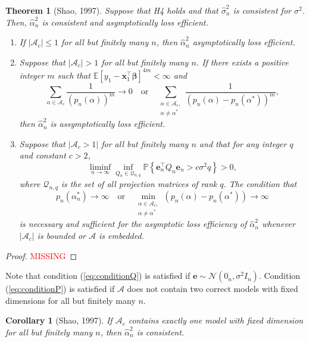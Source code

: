 \documentclass[12pt, letter paper]{article}
\newcommand{\1}{\mathmybb{1}}
\newtheorem{theorem}[proposition]{Theorem}
\newtheorem{corollary}[proposition]{Corollary}
\newcommand{\0}{\emptyset}
\newcommand{\prob}{\mathbb{P}}
\newcommand{\Ep}[1]{\mathbb{E}\left[ #1 \right]}
\newcommand{\paren}[1]{\left(#1 \right)}
\newcommand{\set}[1]{\left\{ #1 \right\}}
\newcommand{\Acal}{\mathcal{A}}
\newcommand{\Ncal}{\mathcal{N}}
\newcommand{\x}{\boldsymbol{x}}
\newcommand{\e}{\boldsymbol{e}}
\newcommand{\bbeta}{\boldsymbol{\beta}}
\newcommand{\alphahat}[1]{\hat{\alpha}^{#1}}
\newcommand{\sigmahat}{\hat{\sigma}^{2}_{n}}
\begin{document}
\begin{theorem}[Shao, 1997]\label{prop:97thm1}
    Suppose that H4 holds and that \(\sigmahat\) is consistent for \(\sigma^{2}\). Then, \(\alphahat{2}_{n}\) is consistent and asymptotically loss efficient.
    \begin{enumerate}
        \item If \(|\Acal_{c}|\leq1\) for all but finitely many \(n\), then \(\alphahat{2}_{n}\) asymptotically loss efficient.
        \item Suppose that \(|\Acal_{c}|> 1\) for all but finitely many \(n\). If there exists a positive integer \(m\) such that \(\Ep{y_{1} - \x_{1}^{\top}\bbeta}^{4m}<\infty\) and 
        \begin{equation}
            \sum_{\alpha\in\Acal_{c}}\frac{1}{\paren{p_{n}(\alpha)}^{m}}\to 0 \quad\text{or}\quad \sum_{\substack{\alpha\in\Acal_{c},\\ \alpha\neq\alpha^{*}}}\frac{1}{\paren{p_{n}(\alpha) - p_{n}(\alpha^{*})}^{m}},
        \end{equation}
        then \(\alphahat{2}_{n}\) is assymptotically loss efficient.
        \item Suppose that \(|\Acal_{c}>1|\) for all but finitely many \(n\) and that for any integer \(q\) and constant \(c>2\), 
        \begin{equation}
            \label{eq:conditionQ}
            \liminf_{n\to\infty}\inf_{Q_{n}\in\mathcal{Q}_{n,q}}\prob\set{\e_{n}^{\top}Q_{n}\e_{n} > c\sigma^{2}q} > 0,
        \end{equation}
        where \(\mathcal{Q}_{n,q}\) is the set of all projection matrices of rank \(q\). The condition that
        \begin{equation}
            \label{eq:conditionP}
            p_{n}(\alpha^{*}_{n})\to\infty\quad\text{or}\quad \min_{\substack{\alpha\in\Acal_{c},\\ \alpha\neq\alpha^{*}}}\paren{p_{n}(\alpha) - p_{n}(\alpha^{*})}\to\infty
        \end{equation}
        is necessary and sufficient for the asymptotic loss efficiency of \(\alphahat{2}_{n}\) whenever \(|\Acal_{c}|\) is bounded or \(\Acal\) is embedded.
    \end{enumerate}
\end{theorem}

\begin{proof}
    \textcolor{red}{MISSING}
\end{proof}

Note that condition (\ref{eq:conditionQ}) is satisfied if \(\e\sim\Ncal(0_{n}, \sigma^{2}I_{n})\). Condition (\ref{eq:conditionP}) is satisfied if \(\Acal\) does not contain two correct models with fixed dimensions for all but finitely many \(n\).
\begin{corollary}[Shao, 1997]
    If \(\Acal_{c}\) contains exactly one model with fixed dimension for all but finitely many \(n\), then \(\alphahat{2}_{n}\) is consistent.
\end{corollary}
\end{document}
